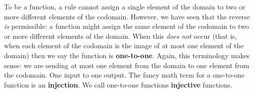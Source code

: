 \documentclass[10pt,]{book}
\newcommand{\terminology}[1]{\textbf{#1}}
\theoremstyle{plain}
\theoremstyle{definition}
\theoremstyle{definition}
\theoremstyle{definition}
\numberwithin{equation}{chapter}
\begin{document}
      To be a function, a rule cannot assign a single element of the domain to two or more different elements of the codomain. However, we have seen that the reverse \emph{is} permissible: a function might assign the same element of the codomain to two or more different elements of the domain. When this \emph{does not} occur (that is, when each element of the codomain is the image of at most one element of the domain) then we say the function is
      \terminology{one-to-one}. Again, this terminology makes sense: we are sending at most one element from the domain to one element from the codomain. One input to one output. The fancy math term for a one-to-one function is an
      \terminology{injection}. We call one-to-one functions
      \terminology{injective} functions.
\par
\end{document}
